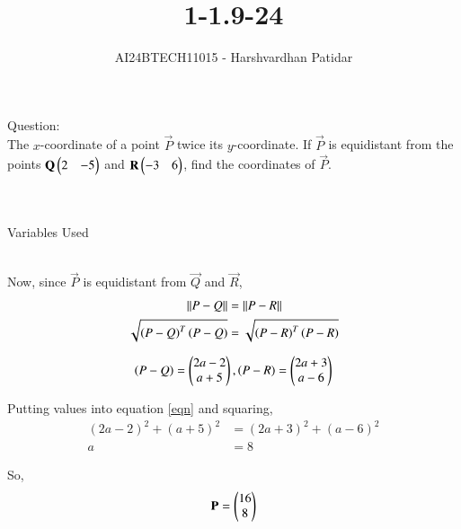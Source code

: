 \documentclass[journal]{IEEEtran}
\begin{document}

\vspace{3cm}

\title{1-1.9-24}
\author{AI24BTECH11015 - Harshvardhan Patidar}
 \maketitle
{\let\newpage\relax\maketitle}

\renewcommand{\thefigure}{\theenumi}
\renewcommand{\thetable}{\theenumi}
\setlength{\intextsep}{10pt} %


\renewcommand{\thetable}{\theenumi}


	Question:\\
		The $x$-coordinate of a point $\vec{P}$ twice its $y$-coordinate. If $\vec{P}$ is equidistant from the points $\mathbf{Q} \begin{pmatrix}2&-5\end{pmatrix}$ and $\mathbf{R} \begin{pmatrix}-3&6\end{pmatrix}$, find the coordinates of $\vec{P}$.\\ \\


	\solution\\
		\begin{table}[h!]    
  			\centering
  			
  			\caption{Variables Used}
  			\label{tab1-1.9-24}
		\end{table}\\

		
		Now, since $\vec{P}$ is equidistant from $\vec{Q}$ and $\vec{R}$,
			\begin{align}
				\left\lVert P - Q\right\rVert  &=  \left\lVert P - R \right\rVert\\
				\sqrt{\left(P-Q\right)^T\left(P-Q\right)}&=\sqrt{\left(P-R\right)^T\left(P-R\right)} \label{eqn}
			\end{align}

			$$ \left(P-Q\right) = \begin{pmatrix}2a-2\\a+5\end{pmatrix}, \left(P-R\right) = \begin{pmatrix}2a+3\\a-6\end{pmatrix}$$

			Putting values into equation \eqref{eqn} and squaring,
			\begin{align}	
				(2a-2)^2 + (a+5)^2 &= (2a+3)^2 + (a-6)^2\\
				a &= 8
			\end{align}

			So, 
			\begin{align}
				\mathbf{P} = \begin{pmatrix}16\\8\end{pmatrix}
			\end{align}
\end{document}
